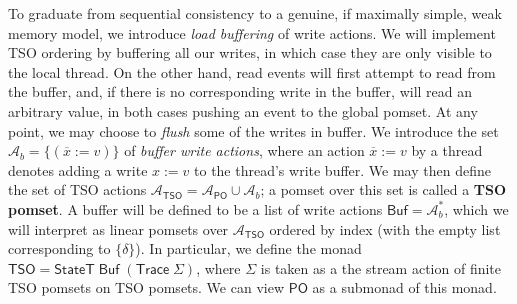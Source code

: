 \documentclass[acmsmall,screen,review]{acmart}
\newcommand{\mc}[1]{\ensuremath{\mathcal{#1}}}
\newcommand{\ms}[1]{\ensuremath{\mathsf{#1}}}
\newcommand{\bufloc}[1]{\overline{#1}}
\begin{document}
To graduate from sequential consistency to a genuine, if maximally simple, weak
memory model, we introduce \textit{load buffering} of write actions. We will
implement TSO ordering by buffering all our writes, in which case they are only
visible to the local thread. On the other hand, read events will first attempt
to read from the buffer, and, if there is no corresponding write in the buffer,
will read an arbitrary value, in both cases pushing an event to the global
pomset. At any point, we may choose to \textit{flush} some of the writes in
buffer. We introduce the set \(\mc{A}_b = \{(\bufloc{x} := v)\}\) of
\textit{buffer write actions}, where an action \(\bufloc{x} := v\) by a thread
denotes adding a write \(x := v\) to the thread's write buffer. We may then
define the set of TSO actions \(\mc{A}_{\ms{TSO}} = \mc{A}_{\ms{PO}} \cup
\mc{A}_b\); a pomset over this set is called a \textbf{TSO pomset}. A
buffer will be defined to be a list of write actions \(\ms{Buf} = \mc{A}_b^*\),
which we will interpret as linear pomsets over \(\mc{A}_{\ms{TSO}}\) ordered by
index (with the empty list corresponding to \(\{\delta\}\)). In particular, we
define the monad \(\ms{TSO} = \ms{StateT}\;\ms{Buf}\;(\ms{Trace}\;\Sigma)\),
where \(\Sigma\) is taken as a the stream action of finite TSO pomsets on TSO
pomsets. We can view \(\ms{PO}\) as a submonad of this monad.
\end{document}
